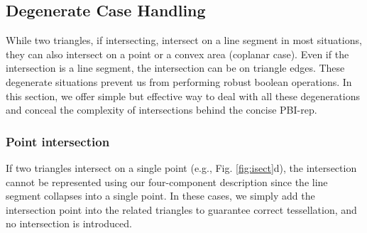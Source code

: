\documentclass[10pt,journal,compsoc]{IEEEtran}
\begin{document}
\subsection{Degenerate Case Handling}
\label{sec:degenerate}

While two triangles, if intersecting, intersect on a line segment in most situations, they can also intersect on a point or a convex area (coplanar case). Even if the intersection is a line segment, the intersection can be on triangle edges. These degenerate situations prevent us from performing robust boolean operations. In this section, we offer simple but effective way to deal with all these degenerations and conceal the complexity of intersections behind the concise PBI-rep.

\subsubsection{Point intersection}
\label{sec:ipoint}
If two triangles intersect on a single point (e.g., Fig. \ref{fig:isect}d), the intersection cannot be represented using our four-component description since the line segment collapses into a single point. In these cases, we simply add the intersection point into the related triangles to guarantee correct tessellation, and no intersection is introduced.
\end{document}
